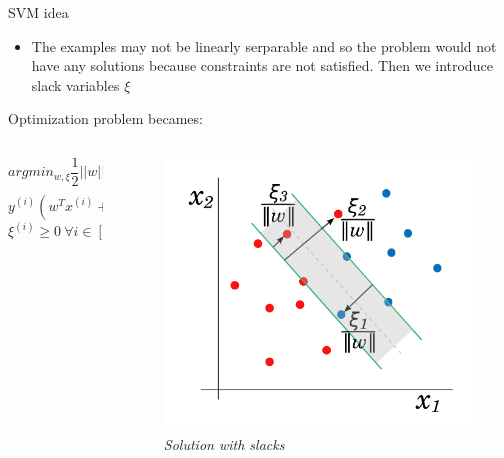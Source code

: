 \begin{frame}{SVM idea}
	\begin{itemize}\setlength\itemsep{1em}
		\item The examples may not be linearly serparable and so the problem would not have any solutions because constraints are not satisfied. Then we introduce slack variables $\xi$
	\end{itemize}
	Optimization problem becames:
	\begin{columns}
		\begin{column}{0.5\textwidth}\centering
			$$arg min_{w, \xi} \frac{1}{2} ||w||^2 + C \sum_{i = 1}{n}\xi^{(i)}$$
			$$y^{(i)} (w^T x^{(i)} + b) \geq 1 - \xi^{(i)} \ \forall i \in [1, n]$$
			$$\xi^{(i)} \geq 0 \ \forall i \in [1, n]$$
		\end{column}
		\begin{column}{0.5\textwidth}\centering
			\begin{figure}[htbp]
				\centering
				\includegraphics[scale = 0.15]{./images/slack2.png}
				\caption{\textit{Solution with slacks}}
			\end{figure}
		\end{column}
	\end{columns}
	
\end{frame}